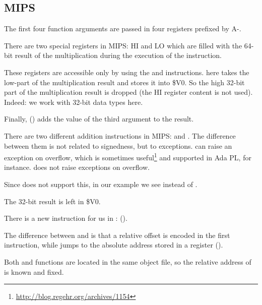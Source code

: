 \subsection{MIPS}



The first four function arguments are passed in four registers prefixed by A-.


There are two special registers in MIPS: HI and LO which are filled with the 64-bit result of the multiplication during the execution of the  instruction.

These registers are accessible only by using the  and  instructions.
 here takes the low-part of the multiplication result and stores it into \$V0.
So the high 32-bit part of the multiplication result is dropped (the HI register content is not used).
Indeed: we work with 32-bit \Tint data types here.


Finally,  () adds the value of the third argument to the result.


There are two different addition instructions in MIPS:  and .
The difference between them is not related to signedness, but to exceptions.  can raise an exception on overflow, which is sometimes useful\footnote{\url{http://blog.regehr.org/archives/1154}} and supported in Ada \ac{PL}, for instance.
 does not raise exceptions on overflow.

Since \CCpp does not support this, in our example we see  instead of .

The 32-bit result is left in \$V0.


There is a new instruction for us in \main:  (). 

The difference between  and  is that a relative offset is encoded in the first instruction, 
while  jumps to the absolute address stored in a register ().

Both \ttf and \main functions are located in the same object file, so the relative address of \ttf 
is known and fixed.
